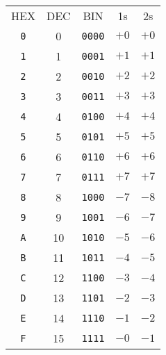 \begin{tabular}{ccccc}
    HEX        & DEC & BIN           & 1s   & 2s   \\
    \texttt{0} & 0   & \texttt{0000} & $+0$ & $+0$ \\
    \texttt{1} & 1   & \texttt{0001} & $+1$ & $+1$ \\
    \texttt{2} & 2   & \texttt{0010} & $+2$ & $+2$ \\
    \texttt{3} & 3   & \texttt{0011} & $+3$ & $+3$ \\
    \texttt{4} & 4   & \texttt{0100} & $+4$ & $+4$ \\
    \texttt{5} & 5   & \texttt{0101} & $+5$ & $+5$ \\
    \texttt{6} & 6   & \texttt{0110} & $+6$ & $+6$ \\
    \texttt{7} & 7   & \texttt{0111} & $+7$ & $+7$ \\
    \texttt{8} & 8   & \texttt{1000} & $-7$ & $-8$ \\
    \texttt{9} & 9   & \texttt{1001} & $-6$ & $-7$ \\
    \texttt{A} & 10  & \texttt{1010} & $-5$ & $-6$ \\
    \texttt{B} & 11  & \texttt{1011} & $-4$ & $-5$ \\
    \texttt{C} & 12  & \texttt{1100} & $-3$ & $-4$ \\
    \texttt{D} & 13  & \texttt{1101} & $-2$ & $-3$ \\
    \texttt{E} & 14  & \texttt{1110} & $-1$ & $-2$ \\
    \texttt{F} & 15  & \texttt{1111} & $-0$ & $-1$ \\
\end{tabular}

